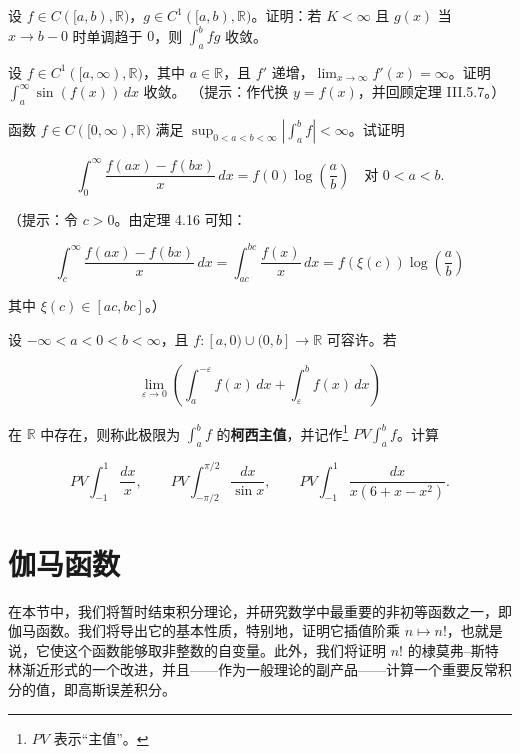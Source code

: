 \begin{exercises}
\begin{subitems}
设 $ f \in C([a, b), \mathbb{R}) $，$ g \in C^1([a, b), \mathbb{R}) $。证明：若 $ K < \infty $ 且 $ g(x) $ 当 $ x \to b - 0 $ 时单调趋于 $ 0 $，则 $ \int_{a}^{b} fg $ 收敛。

\end{subitems}

\item

设 $ f \in C^1([a, \infty), \mathbb{R}) $，其中 $ a \in \mathbb{R} $，且 $ f' $ 递增，$ \lim_{x \to \infty} f'(x) = \infty $。证明 $ \int_{a}^{\infty} \sin(f(x)) \, dx $ 收敛。
（提示：作代换 $ y = f(x) $，并回顾定理 III.5.7。）

\item

函数 $ f \in C([0, \infty), \mathbb{R}) $ 满足 $ \sup_{0 < a < b < \infty} \left| \int_{a}^{b} f \right| < \infty $。试证明

\[
\int_{0}^{\infty} \frac{f(ax) - f(bx)}{x} \, dx = f(0) \log\left( \frac{a}{b} \right) \quad \text{对 } 0 < a < b .
\]

（提示：令 $ c > 0 $。由定理 4.16 可知：

\[
\int_{c}^{\infty} \frac{f(ax) - f(bx)}{x} \, dx = \int_{ac}^{bc} \frac{f(x)}{x} \, dx = f(\xi(c)) \log\left( \frac{a}{b} \right)
\]

其中 $ \xi(c) \in [ac, bc] $。）

\item

设 $ -\infty < a < 0 < b < \infty $，且 $ f : [a, 0) \cup (0, b] \to \mathbb{R} $ 可容许。若

\[
\lim_{\varepsilon \to 0} \left( \int_{a}^{-\varepsilon} f(x) \, dx + \int_{\varepsilon}^{b} f(x) \, dx \right)
\]

在 $ \mathbb{R} $ 中存在，则称此极限为 $ \int_{a}^{b} f $ 的\textbf{柯西主值}，并记作\footnote{$ PV $ 表示“主值”。} $ PV \int_{a}^{b} f $。计算

\[
PV \int_{-1}^{1} \frac{dx}{x} , \qquad PV \int_{-\pi/2}^{\pi/2} \frac{dx}{\sin x} , \qquad PV \int_{-1}^{1} \frac{dx}{x(6 + x - x^2)} .
\]
\end{exercises}

\section{伽马函数}

在本节中，我们将暂时结束积分理论，并研究数学中最重要的非初等函数之一，即伽马函数。我们将导出它的基本性质，特别地，证明它插值阶乘 $ n \mapsto n! $，也就是说，它使这个函数能够取非整数的自变量。此外，我们将证明 $ n! $ 的棣莫弗–斯特林渐近形式的一个改进，并且——作为一般理论的副产品——计算一个重要反常积分的值，即高斯误差积分。

